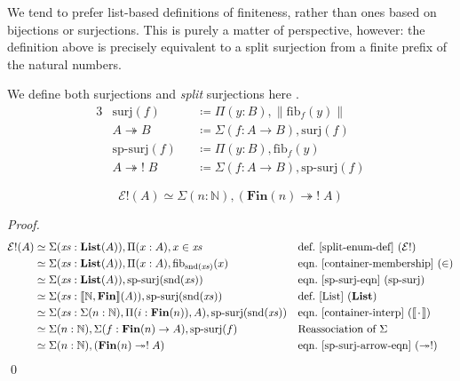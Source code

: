 We tend to prefer list-based definitions of finiteness, rather than ones based
on bijections or surjections.
This is purely a matter of perspective, however: the definition above is
precisely equivalent to a split surjection from a finite prefix of the natural
numbers.
\begin{romdefinition}[Surjections] \label{surjections}
  We define both surjections and \emph{split} surjections here \cite[definition
  4.6.1]{hottbook}.
  \begin{alignat}{3}
    &\text{surj}(f)             &&\coloneqq \Pi(y : B) , \lVert \text{fib}_f(y) \rVert \\
    &A \twoheadrightarrow B     &&\coloneqq \Sigma (f : A \rightarrow B) , \text{surj}(f) \label{surj-arrow-eqn} \\
    &\text{sp-surj}(f)          &&\coloneqq \Pi(y : B) , \text{fib}_f(y) \label{sp-surj-eqn} \\
    &A \twoheadrightarrow! \; B &&\coloneqq \Sigma (f : A \rightarrow B) , \text{sp-surj}(f) \label{sp-surj-arrow-eqn}
  \end{alignat}
\end{romdefinition}
\begin{romlemma} \label{split-enum-is-split-surj}
  \begin{equation}
    \mathcal{E}!(A) \simeq \Sigma (n : \mathbb{N}) , \left( \mathbf{Fin}(n) \twoheadrightarrow ! \; A \right)
  \end{equation}
\end{romlemma}
\begin{proof}
  \begin{align*}
    \mathcal{E}!(A)
    & \simeq \Sigma (\mathit{xs} : \textbf{List}(A)) , \Pi {(x : A)} , x \in \mathit{xs}
    && \text{def.~\ref{split-enum-def} }(\mathcal{E}!)
    \\
    & \simeq \Sigma (\mathit{xs} : \textbf{List}(A)) , \Pi {(x : A)} , \text{fib}_{\text{snd}(\mathit{xs})}(x)
    && \text{eqn.~\ref{container-membership} } (\in)
    \\
    & \simeq \Sigma (\mathit{xs} : \textbf{List}(A)) , \text{sp-surj}(\text{snd}(\mathit{xs}))
    && \text{eqn.~\ref{sp-surj-eqn} (sp-surj)}
    \\
    & \simeq \Sigma (\mathit{xs} : \llbracket \mathbb{N} , \mathbf{Fin} \rrbracket (A)) , \text{sp-surj}(\text{snd}(\mathit{xs}))
    && \text{def.~\ref{List} } (\mathbf{List})
    \\
    & \simeq \Sigma (\mathit{xs} : \Sigma (n : \mathbb{N}) , \Pi (i : \mathbf{Fin}(n)) , A) , \text{sp-surj}(\text{snd}(\mathit{xs}))
    && \text{eqn.~\ref{container-interp} } (\llbracket {\mkern 2mu\cdot\mkern 2mu} \rrbracket)
    \\
    & \simeq \Sigma (n : \mathbb{N}) , \Sigma (f : \mathbf{Fin}(n) \rightarrow A) , \text{sp-surj}(f)
    && \text{Reassociation of } \Sigma
    \\
    & \simeq \Sigma (n : \mathbb{N}) , ( \mathbf{Fin}(n) \twoheadrightarrow ! \; A )
    && \text{eqn.~\ref{sp-surj-arrow-eqn} } (\twoheadrightarrow!)
  \end{align*}
  \qed
\end{proof}

